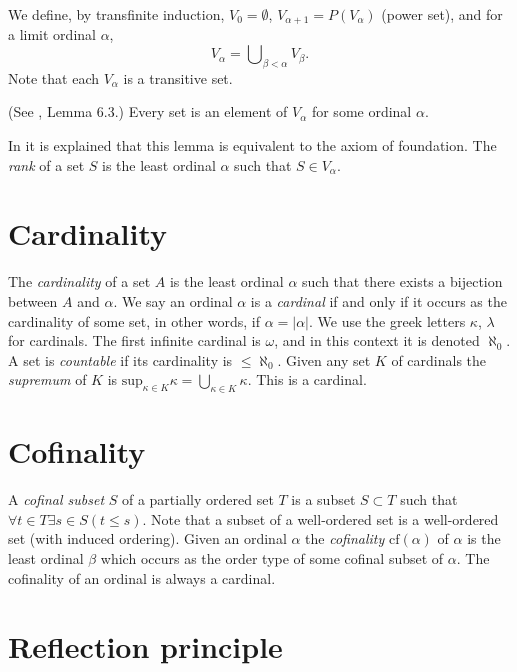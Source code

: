 \medskip\noindent
We define, by transfinite induction, $V_0 = \emptyset$,
$V_{\alpha + 1} = P(V_\alpha)$ (power set),
and for a limit ordinal $\alpha$,
$$
V_\alpha = \bigcup\nolimits_{\beta < \alpha} V_\beta.
$$
Note that each $V_\alpha$ is a transitive set.

\begin{lemma}
\label{axiom-regularity}
(See \cite{Jech}, Lemma 6.3.)
Every set is an element of $V_\alpha$ for some ordinal $\alpha$.
\end{lemma}

\noindent
In \cite[Chapter III]{Kunen} it is explained that this lemma is
equivalent to the axiom of foundation. The {\it rank} of
a set $S$ is the least ordinal $\alpha$ such that $S \in V_\alpha$.

\section{Cardinality}
\label{section-cardinals}

\noindent
The {\it cardinality} of a set $A$ is the least ordinal $\alpha$
such that there exists a bijection between $A$ and $\alpha$.
We say an ordinal $\alpha$ is a {\it cardinal} if and only
if it occurs as the cardinality of some set, in other words, if
$\alpha = |\alpha|$. We use the greek letters $\kappa$, $\lambda$
for cardinals. The first infinite cardinal is $\omega$, and in this
context it is denoted $\aleph_0$. A set is {\it countable} if its cardinality
is $\leq \aleph_0$.
Given any set $K$ of cardinals the {\it supremum} of $K$
is $\text{sup}_{\kappa \in K} \kappa = \bigcup_{\kappa \in K} \kappa$.
This is a cardinal.

\section{Cofinality}
\label{section-cofinality}

\noindent
A {\it cofinal subset} $S$ of a partially ordered set $T$ is a subset
$S \subset T$ such that $\forall t \in T \exists s\in S (t \leq s)$.
Note that a subset of a well-ordered set is a well-ordered set
(with induced ordering). Given an ordinal $\alpha$ the {\it cofinality}
$\text{cf}(\alpha)$ of $\alpha$ is the least ordinal $\beta$
which occurs as the order type of some cofinal subset of $\alpha$.
The cofinality of an ordinal is always a cardinal.

\section{Reflection principle}
\label{section-reflection-principle}

